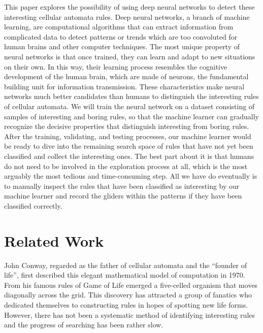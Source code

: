 \documentclass[12pt]{article}
\numberwithin{figure}{section} %
\begin{document}
This paper explores the possibility of using deep neural networks to detect these interesting cellular automata rules. Deep neural networks, a branch of machine learning, are computational algorithms that can extract information from complicated data to detect patterns or trends which are too convoluted for human brains and other computer techniques. The most unique property of neural networks is that once trained, they can learn and adapt to new situations on their own. In this way, their learning process resembles the cognitive development of the human brain, which are made of neurons, the fundamental building unit for information transmission. These characteristics make neural networks much better candidates than humans to distinguish the interesting rules of cellular automata. We will train the neural network on a dataset consisting of samples of interesting and boring rules, so that the machine learner can gradually recognize the decisive properties that distinguish interesting from boring rules. After the training, validating, and testing processes, our machine learner would be ready to dive into the remaining search space of rules that have not yet been classified and collect the interesting ones. The best part about it is that humans do not need to be involved in the exploration process at all, which is the most arguably the most tedious and time-consuming step. All we have do eventually is to manually inspect the rules that have been classified as interesting by our machine learner and record the gliders within the patterns if they have been classified correctly. 

\newpage
\section{Related Work}
John Conway, regarded as the father of cellular automata and the “founder of life”, first described this elegant mathematical model of computation in 1970. From his famous rules of Game of Life emerged a five-celled organism that moves diagonally across the grid. This discovery has attracted a group of fanatics who dedicated themselves to constructing rules in hopes of spotting new life forms. However, there has not been a systematic method of identifying interesting rules and the progress of searching has been rather slow. 
\end{document}
